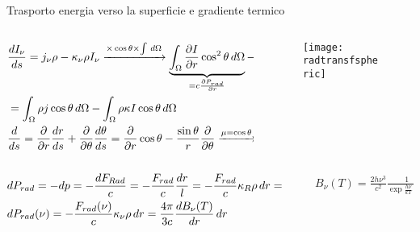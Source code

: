 \begin{frame}{Trasporto energia verso la superficie e gradiente termico}
    \begin{columns}[T]
        \begin{column}{0.6\textwidth}
    \begin{align*}
        &\TDy{s}{I_{\nu}}=j_{\nu}\rho-\kappa_{\nu}\rho I_{\nu}\xrightarrow{\times\cos{\theta}\times\int\,d\Omega}\underbrace{\int_{\Omega}\PDy{r}{I}\cos^2{\theta}\,d\Omega}_{=c\PDy{r}{P_{rad}}}-\underbrace{\int_{\Omega}\frac{1}{r}\PDy{r}{I}\cos{\theta}\sin{\theta}\,d\Omega}_{\frac{c}{r}(3P_{rad}-u)}\\
        &=\int_{\Omega}\rho j\cos{\theta}\,d\Omega-\int_{\Omega}\rho\kappa I\cos{\theta}\,d\Omega\\
        &\TDof{s}=\PDof{r}\TDy{s}{r}+\PDof{\theta}\TDy{s}{\theta}=\PDof{r}\cos{\theta}-\frac{\sin{\theta}}{r}\PDof{\theta}\xrightarrow{\mu=\cos{\theta}}\mu\PDof{r}+\invers{r}(1-\mu^2)\PDof{\theta}
    \end{align*}
        \end{column}
        \begin{column}{0.4\textwidth}
            \begin{figure}[!ht]
                \centering
                \texttt{[image: radtransfspheric]}
                \label{fig:gradalongray}
            \end{figure}
        \end{column}
    \end{columns}
    
    \begin{columns}[T]
        \begin{column}{0.7\textwidth}
\begin{align*}
&dP_{rad}=-dp=-\frac{dF_{Rad}}{c}=-\frac{F_{rad}}{c}\frac{dr}{l}=-\frac{F_{rad}}{c}\kappa_R\rho\,dr=\frac{4}{3}aT^3dT\\
&dP_{rad}(\nu)=-\frac{F_{rad}(\nu)}{c}\kappa_{\nu}\rho\,dr=\frac{4\pi}{3c}\TDy{r}{B_{\nu}(T)}\,dr
\end{align*}
        \end{column}
        \begin{column}{0.3\textwidth}
\begin{align*}
&B_{\nu}(T)=\frac{2h\nu^3}{c^2}\frac{1}{\exp{\frac{h\nu}{kT}}-1}
\end{align*}
        \end{column}
    \end{columns}


\end{frame}
